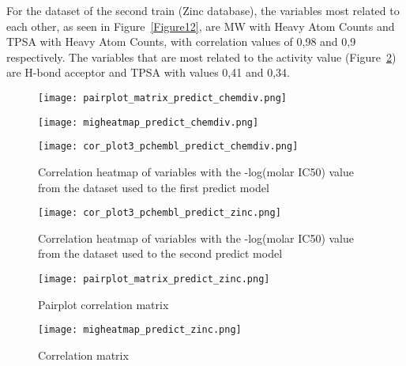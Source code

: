 \documentclass[final,times,twocolumn,article]{elsarticle}
\begin{document}
 For the dataset of the second train (Zinc database), the variables most related to each other, as seen in Figure~\ref{Figure12}, are MW with Heavy Atom Counts and TPSA with Heavy Atom Counts, with correlation values of 0,98 and 0,9 respectively. The variables that are most related to the activity value (Figure~\ref{Figure11}) are H-bond acceptor and TPSA with values 0,41 and 0,34. 

\begin{figure*}
    \begin{subfigure}{0.5\textwidth}
        \texttt{[image: pairplot\_matrix\_predict\_chemdiv.png]} 
        \caption{}
    \end{subfigure}
    \hfill
    \begin{subfigure}{0.5\textwidth}
        \texttt{[image: migheatmap\_predict\_chemdiv.png]}
        \caption{}
    \end{subfigure}
    
    \caption{Correlation analysis from the dataset used to the first predict model (ChemDiv). (a)Pariplot correlation matrix (b)Correlation matrix heatmap}
    \label{Figure9}
\end{figure*}

\begin{figure}[h]
    \centering 
     \texttt{[image: cor\_plot3\_pchembl\_predict\_chemdiv.png]}	
     \caption{Correlation heatmap of variables with the -log(molar IC50) value from the dataset used to the first predict model} 
     \label{Figure10}
 \end{figure}

 \begin{figure}[h]
    \centering 
     \texttt{[image: cor\_plot3\_pchembl\_predict\_zinc.png]}	
     \caption{Correlation heatmap of variables with the -log(molar IC50) value from the dataset used to the second predict model} 
     \label{Figure11}
 \end{figure}

 \begin{figure*}
    \begin{subfigure}{0.5\textwidth}
        \texttt{[image: pairplot\_matrix\_predict\_zinc.png]} 
        \caption{Pairplot correlation matrix}
    \end{subfigure}
    \hfill
    \begin{subfigure}{0.5\textwidth}
        \texttt{[image: migheatmap\_predict\_zinc.png]}
        \caption{Correlation matrix}
    \end{subfigure}
    
    \caption{Correlation analysis from the dataset used to the second predict model}
    \label{Figure12}
\end{figure*}
\end{document}
